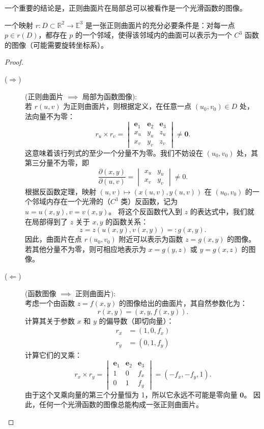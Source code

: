 \documentclass[lang=cn,10pt,thmcnt=section]{elegantbook}
\renewcommand{\vec}[1]{\mathbf{#1}}
\begin{document}
一个重要的结论是，正则曲面片在局部总可以被看作是一个光滑函数的图像。

\begin{proposition}
    一个映射 $r: D \subset \mathbb{R}^2 \to \mathbb{E}^3$ 是一张正则曲面片的充分必要条件是：对每一点 $p \in r(D)$，都存在 $p$ 的一个邻域，使得该邻域内的曲面可以表示为一个 $C^3$ 函数的图像（可能需要旋转坐标系）。
\end{proposition}
\begin{proof}
    \begin{description}
        \item[($\Rightarrow$)] (正则曲面片 $\implies$ 局部为函数图像): \\
        若 $r(u,v)$ 为正则曲面片，则根据定义，在任意一点 $(u_0, v_0) \in D$ 处，法向量不为零：
        \[
        r_u \times r_v = \begin{vmatrix} \mathbf{e}_1 & \mathbf{e}_2 & \mathbf{e}_3 \\ x_u & y_u & z_u \\ x_v & y_v & z_v \end{vmatrix} \neq \vec{0}.
        \]
        这意味着该行列式的至少一个分量不为零。我们不妨设在 $(u_0, v_0)$ 处，其第三分量不为零，即
        \[
        \frac{\partial (x,y)}{\partial (u,v)} = \begin{vmatrix} x_u & y_u \\ x_v & y_v \end{vmatrix} \neq 0.
        \]
        根据反函数定理，映射 $(u,v) \mapsto (x(u,v), y(u,v))$ 在 $(u_0, v_0)$ 的一个邻域内存在一个光滑的（$C^3$ 类）反函数，记为 $u=u(x,y), v=v(x,y)$。
        将这个反函数代入到 $z$ 的表达式中，我们就在局部得到了 $z$ 关于 $x, y$ 的函数关系：
        \[
        z = z(u(x, y), v(x, y)) =: g(x,y).
        \]
        因此，曲面片在点 $r(u_0,v_0)$ 附近可以表示为函数 $z=g(x,y)$ 的图像。若其他分量不为零，则可相应地表示为 $x=g(y,z)$ 或 $y=g(x,z)$ 的图像。

        \item[($\Leftarrow$)] (函数图像 $\implies$ 正则曲面片): \\
        考虑一个由函数 $z=f(x,y)$ 的图像给出的曲面片，其自然参数化为：
        \[
        r(x,y) = (x, y, f(x,y)).
        \]
        计算其关于参数 $x$ 和 $y$ 的偏导数（即切向量）：
        \begin{align*}
            r_x &= (1, 0, f_x) \\
            r_y &= (0, 1, f_y)
        \end{align*}
        计算它们的叉乘：
        \[
        r_x \times r_y = \begin{vmatrix} \mathbf{e}_1 & \mathbf{e}_2 & \mathbf{e}_3 \\ 1 & 0 & f_x \\ 0 & 1 & f_y \end{vmatrix} = (-f_x, -f_y, 1).
        \]
        由于这个叉乘向量的第三个分量恒为 1，所以它永远不可能是零向量 $\vec{0}$。
        因此，任何一个光滑函数的图像总能构成一张正则曲面片。
    \end{description}
\end{proof}
\end{document}
